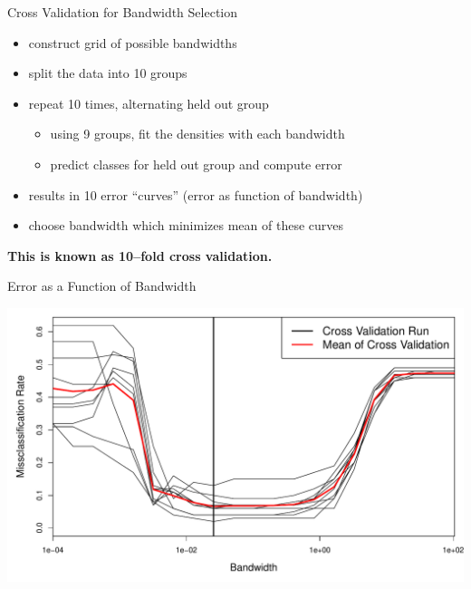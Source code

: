 \documentclass[12pt]{beamer}
\begin{document}
\begin{frame}{Cross Validation for Bandwidth Selection}
  \begin{itemize}
  \item construct grid of possible bandwidths
  \item split the data into 10 groups
  \item repeat 10 times, alternating held out group
    \begin{itemize}
    \item using 9 groups, fit the densities with each bandwidth
    \item predict classes for held out  group and compute error
    \end{itemize}
  \item results in 10 error ``curves'' (error as function of bandwidth)
  \item choose bandwidth which minimizes mean of these curves
  \end{itemize}

\vspace{.2in}
  
  \begin{center}
    \textbf{This is known as 10--fold cross validation.}
  \end{center}
\end{frame}



\begin{frame}{Error as a Function of Bandwidth}

  \begin{center}
    \includegraphics[scale=0.4]{figs/kde_cv.pdf}
  \end{center}
  
\end{frame}
\end{document}
